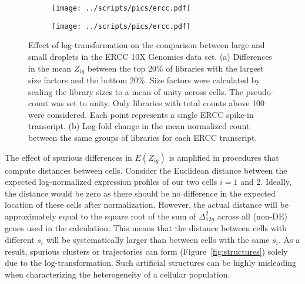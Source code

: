 \documentclass[10pt,letterpaper]{article}
\begin{document}
\begin{figure}
\centering
\begin{subfigure}[b]{0.49\textwidth}
    \texttt{[image: ../scripts/pics/ercc.pdf]}
    \caption{}
\end{subfigure}
\begin{subfigure}[b]{0.49\textwidth}
    \texttt{[image: ../scripts/pics/ercc.pdf]}
    \caption{}
\end{subfigure}
\caption{Effect of log-transformation on the comparison between large and small droplets in the ERCC 10X Genomics data set.
(a) Differences in the mean $Z_{ig}$ between the top 20\% of libraries with the largest size factors and the bottom 20\%.
Size factors were calculated by scaling the library sizes to a mean of unity across cells.
The pseudo-count was set to unity.
Only libraries with total counts above 100 were considered.
Each point represents a single ERCC spike-in transcript.
(b) Log-fold change in the mean normalized count between the same groups of libraries for each ERCC transcript.}
\label{fig:ercc}
\end{figure}

The effect of spurious differences in $E(Z_{ig})$ is amplified in procedures that compute distances between cells.
Consider the Euclidean distance between the expected log-normalized expression profiles of our two cells $i=1$ and 2.
Ideally, the distance would be zero as there should be no difference in the expected location of these cells after normalization.
However, the actual distance will be approximately equal to the square root of the sum of $\Delta_{12g}^2$ across all (non-DE) genes used in the calculation.
This means that the distance between cells with different $s_i$ will be systematically larger than between cells with the same $s_i$.
As a result, spurious clusters or trajectories can form (Figure~\ref{fig:structures}) solely due to the log-transformation.
Such artificial structures can be highly misleading when characterizing the heterogeneity of a cellular population.
\end{document}

